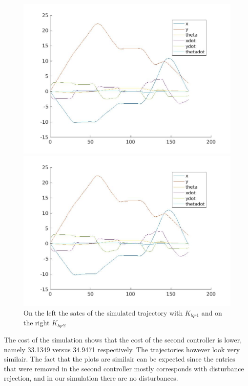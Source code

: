\documentclass[•]{article}
\begin{document}
\begin{figure}[H]
\begin{minipage}{.45\textwidth}
\includegraphics[width = \textwidth]{lqr1states.jpg}
\end{minipage}
\begin{minipage}{.45\textwidth}
\includegraphics[width = \textwidth]{lqr2states.jpg}
\end{minipage}
\caption{On the left the sates of the simulated trajectory with $K_{lqr1}$ and on the right $K_{lqr2}$ }
\end{figure}

The cost of the simulation shows that the cost of the second controller is lower, namely 33.1349 versus 34.9471 respectively. The trajectories however look very similair. The fact that the plots are similair can be expected since the entries that were removed in the second controller mostly corresponds with disturbance rejection, and in our simulation there are no disturbances. 
\end{document}

